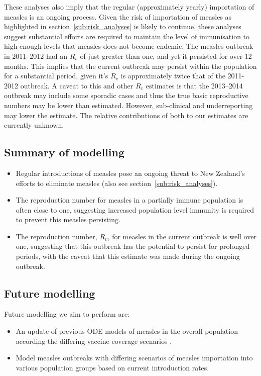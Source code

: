 \documentclass{article}
\begin{document}
{These analyses also imply that the regular (approximately yearly) importation of measles is an ongoing process. Given the risk of importation of measles as highlighted in section~\ref{sub:risk_analyses} is likely to continue, these analyses suggest substantial efforts are required to maintain the level of immunisation to high enough levels that measles does not become endemic. The measles outbreak in 2011--2012 had an $R_v$ of just greater than one, and yet it persisted for over 12 months. This implies that the current outbreak may persist within the population for a substantial period, given it's $R_v$ is approximately twice that of the 2011-2012 outbreak. A caveat to this and other $R_v$ estimates is that the 2013--2014 outbreak may include some sporadic cases and thus the true basic reproductive numbers may be lower than estimated. However, sub-clinical and underreporting may lower the estimate. The relative contributions of both to our estimates are currently unknown.

\subsection{Summary of modelling}
\begin{itemize}
\item Regular introductions of measles pose an ongoing threat to New Zealand's efforts to eliminate measles (also see section~\ref{sub:risk_analyses}).
\item The reproduction number for measles in a partially immune population is often close to one, suggesting increased population level immunity is required to prevent this measles persisting.
 \item The reproduction number, $R_v$, for measles in the current outbreak is well over one, suggesting that this outbreak has the potential to persist for prolonged periods, with the caveat that this estimate was made during the ongoing outbreak.
\end{itemize}

\subsection{Future modelling}
Future modelling we aim to perform are:
\begin{itemize}
\item An update of previous ODE models of measles in the overall population according the differing vaccine coverage scenarios \citep{roberts4}.
\item Model measles outbreaks with differing scenarios of measles importation into various population groups based on current introduction rates.
\end{itemize}

}
\end{document}
